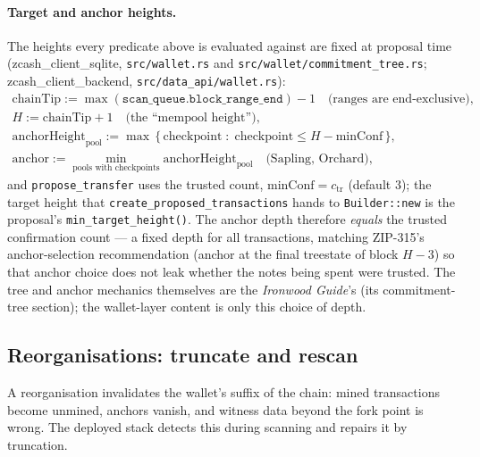 \documentclass[11pt,a4paper]{article}
\theoremstyle{definition}
\begin{document}
\paragraph{Target and anchor heights.} The heights every predicate above
is evaluated against are fixed at proposal time
(\textsf{zcash\_client\_sqlite}, \texttt{src/wallet.rs} and
\texttt{src/wallet/commitment\_tree.rs}; \textsf{zcash\_client\_backend},
\texttt{src/data\_api/wallet.rs}):
\[
\begin{array}{l}
\mathrm{chainTip} := \max(\mathtt{scan\_queue.block\_range\_end}) - 1
  \quad \text{(ranges are end-exclusive)}, \\
H := \mathrm{chainTip} + 1 \quad \text{(the ``mempool height'')}, \\
\mathrm{anchorHeight}_{\mathrm{pool}} := \max\,\{\, \mathrm{checkpoint}
  \;:\; \mathrm{checkpoint} \le H - \mathrm{minConf} \,\}, \\
\mathrm{anchor} := \min_{\text{pools with checkpoints}}
  \mathrm{anchorHeight}_{\mathrm{pool}}
  \quad \text{(Sapling, Orchard)},
\end{array}
\]
and \texttt{propose\_transfer} uses the trusted count,
$\mathrm{minConf} = c_{\mathrm{tr}}$ (default $3$); the target height that
\texttt{create\_proposed\_transactions} hands to \texttt{Builder::new} is
the proposal's \texttt{min\_target\_height()}.
The anchor depth therefore \emph{equals} the trusted confirmation
count --- a fixed depth for all transactions, matching ZIP-315's
anchor-selection recommendation (anchor at the final treestate of block
$H - 3$) so that anchor choice does not leak whether the notes being spent
were trusted. The tree and anchor mechanics themselves are the
\emph{Ironwood Guide}'s (its commitment-tree section); the wallet-layer
content is only this choice of depth.

\subsection{Reorganisations: truncate and rescan}\label{sec:lifecycle-reorg}

A reorganisation invalidates the wallet's suffix of the chain: mined
transactions become unmined, anchors vanish, and witness data beyond the
fork point is wrong. The deployed stack detects this during scanning and
repairs it by truncation.
\end{document}
